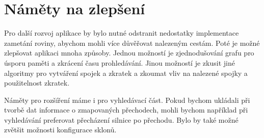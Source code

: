 \section{Náměty na zlepšení}
Pro další rozvoj aplikace by bylo nutné odstranit nedostatky implementace
zametání roviny, abychom mohli více důvěřovat nalezeným cestám. Poté je možné
zlepšovat aplikaci mnoha způsoby. Jednou možností je zjednodušování grafu pro
úsporu paměti a zkrácení času prohledávání. Jinou možností je zkusit jiné
algoritmy pro vytváření spojek a zkratek a zkoumat vliv na nalezené spojky a
použitelnost zkratek.


Náměty pro rozšíření máme i pro vyhledávací část. Pokud bychom ukládali při
tvorbě dat informace o zmapovaných přechodech, mohli bychom například při
vyhledávání preferovat přecházení silnice po přechodu. Bylo by také možné
zvětšit možnosti konfigurace sklonů. 

